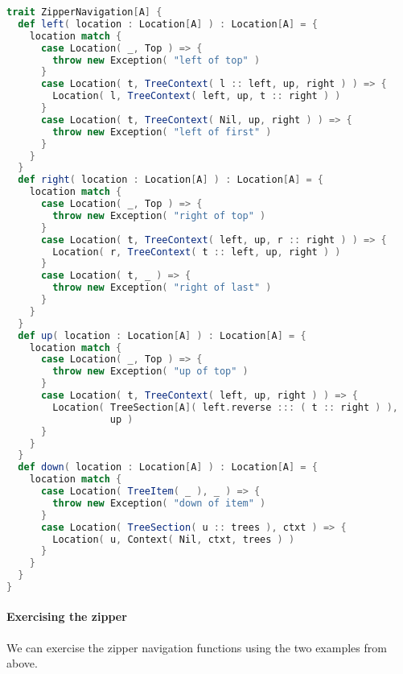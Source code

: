 \begin{lstlisting}[language=Scala,mathescape=true]
trait ZipperNavigation[A] {
  def left( location : Location[A] ) : Location[A] = {
    location match {
      case Location( _, Top ) => {
        throw new Exception( "left of top" )
      }
      case Location( t, TreeContext( l :: left, up, right ) ) => {
        Location( l, TreeContext( left, up, t :: right ) )
      }
      case Location( t, TreeContext( Nil, up, right ) ) => {
        throw new Exception( "left of first" )
      }
    }
  }
  def right( location : Location[A] ) : Location[A] = {
    location match {
      case Location( _, Top ) => {
        throw new Exception( "right of top" )
      }
      case Location( t, TreeContext( left, up, r :: right ) ) => {
        Location( r, TreeContext( t :: left, up, right ) )
      }
      case Location( t, _ ) => {
        throw new Exception( "right of last" )
      }
    }
  }
  def up( location : Location[A] ) : Location[A] = {
    location match {
      case Location( _, Top ) => {
        throw new Exception( "up of top" )
      }   
      case Location( t, TreeContext( left, up, right ) ) => {
        Location( TreeSection[A]( left.reverse ::: ( t :: right ) ),
                  up )
      }
    }
  }
  def down( location : Location[A] ) : Location[A] = {
    location match {
      case Location( TreeItem( _ ), _ ) => {
        throw new Exception( "down of item" )
      }
      case Location( TreeSection( u :: trees ), ctxt ) => {
        Location( u, Context( Nil, ctxt, trees ) )
      }
    }
  }
}
\end{lstlisting}

\paragraph{Exercising the zipper} We can exercise the zipper
navigation functions using the two examples from above.

